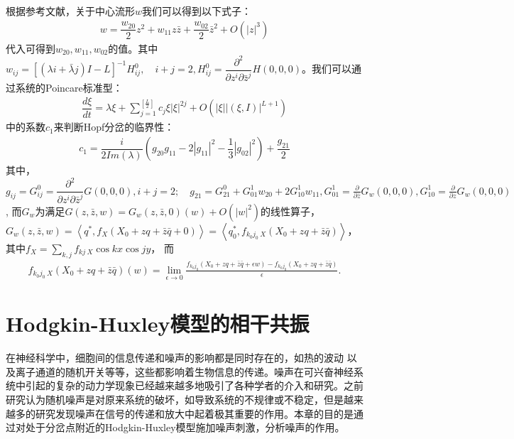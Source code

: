 \documentclass[
pdflinks,
]{xjtuthesis}
\begin{document}
根据参考文献\cite{hassard1981theory}，关于中心流形$w$我们可以得到以下式子：
\begin{align}
w=\dfrac{w_{20}}{2}z^2 +w_{11}z\bar{z}+\dfrac{w_{02}}{2}\bar{z}^2 +O(|z|^3)
\end{align}
代入可得到$w_{20},w_{11},w_{02}$的值。其中$w_{ij}=[(\lambda i+\bar{\lambda}j)I-L]^{-1}H^0_{ij},\quad i+j=2, H^0_{ij}=\dfrac{\partial^2}{\partial z^i \partial \bar{z}^j}H(0, 0, 0)$。我们可以通过系统的Poincare标准型：
\begin{align}
\dfrac{d \xi}{dt} =\lambda \xi+\sum_{j=1}^{\left[\frac{L}{2}\right]}c_j \xi|\xi|^{2j}+O(|\xi||(\xi,I)|^{L+1})
\end{align}
中的系数$c_1$来判断Hopf分岔的临界性：
\begin{align}
c_1=\dfrac{i}{2 Im(\lambda)}(g_{20}g_{11}-2|g_{11}|^2-\dfrac{1}{3}|g_{02}|^2)+\dfrac{g_{21}}{2}
\end{align}
其中，$g_{ij}=G^0_{ij}=\dfrac{\partial^2}{\partial z^i \partial \bar{z}^j}G(0, 0, 0), i + j = 2; \quad g_{21}=G^0_{21}+G^1_{01}w_{20}+2G^1_{10}w_{11},G^1_{01}=
\frac{\partial}{\partial \bar{z}} G _w (0, 0, 0), G^1_{10}=
\frac{\partial}{\partial z} G _w (0, 0, 0)$, 而$G _w$为满足$G(z, \bar{z}, w) = G _w (z, \bar{z}, 0)(w) + O(|w|^2)$的线性算子，$G _w (z, \bar{z}, w) = \left<q ^*, f _X (X_0 + zq + \bar{z}\bar{q} + 0)\right> = \left<q _0 ^*, f _{k _0j _0\ X} (X _0 + zq + \bar{z}\bar{q})\right>$，其中$f _X = \sum _{k,j} f _{kj\ X}\cos kx \cos jy$， 而
\begin{align*}
f _{k _0 j _0\ X} (X _0 + zq + \bar{z}\bar{q}) (w)= \lim _{\epsilon \to 0} \frac{f _{k _0 j _0} (X _0 + zq + \bar{z}\bar{q} + \epsilon w) - f _{k _0 j _0} (X _0 + zq + \bar{z}\bar{q})}{\epsilon}.
\end{align*}

\chapter{Hodgkin-Huxley模型的相干共振}

在神经科学中，细胞间的信息传递和噪声的影响都是同时存在的，如热的波动
以及离子通道的随机开关等等，这些都影响着生物信息的传递。噪声在可兴奋神经系统中引起的复杂的动力学现象已经越来越多地吸引了各种学者的介入和研究。之前研究认为随机噪声是对原来系统的破坏，如导致系统的不规律或不稳定，但是越来越多的研究发现噪声在信号的传递和放大中起着极其重要的作用。本章的目的是通过对处于分岔点附近的Hodgkin-Huxley模型施加噪声刺激，分析噪声的作用。
\end{document}
